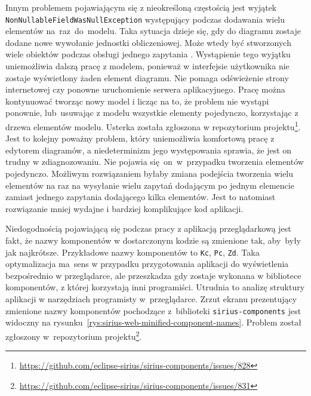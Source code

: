 Innym problemem pojawiającym się z nieokreśloną częstością jest wyjątek
\texttt{NonNullable\-FieldWasNullException} występujący podczas
dodawania wielu
elementów na~raz~do~modelu. Taka sytuacja dzieje się, gdy do diagramu zostaje
dodane nowe wywołanie jednostki obliczeniowej. Może wtedy być stworzonych wiele
obiektów podczas obsługi jednego zapytania \GraphQL{}. Wystąpienie tego
wyjątku uniemożliwia dalszą pracę z modelem, ponieważ w interfejsie użytkownika
nie zostaje wyświetlony żaden element diagramu. Nie pomaga odświeżenie strony
internetowej czy ponowne uruchomienie serwera aplikacyjnego. Pracę można
kontynuować tworząc nowy model i licząc na to, że problem nie wystąpi ponownie,
lub~usuwając z modelu wszystkie elementy pojedynczo, korzystając z drzewa
elementów modelu. Usterka została zgłoszona w repozytorium
projektu\footnote{
	\url{https://github.com/eclipse-sirius/sirius-components/issues/828}
}. Jest to kolejny poważny problem, który uniemożliwia komfortową pracę z
edytorem diagramów, a niedeterminizm jego występowania sprawia, że jest on
trudny w zdiagnozowaniu. Nie pojawia się~on~w~przypadku tworzenia elementów
pojedynczo. Możliwym rozwiązaniem byłaby zmiana podejścia tworzenia wielu
elementów na raz na wysyłanie wielu zapytań \GraphQL{} dodającym po jednym
elemencie zamiast jednego zapytania dodającego kilka elementów. Jest to
natomiast rozwiązanie mniej wydajne i bardziej komplikujące kod aplikacji.

Niedogodnością pojawiającą się podczas pracy z aplikacją przeglądarkową
\SiriusWeb{} jest fakt, że nazwy komponentów w dostarczonym kodzie
\JavaScript{} są zmienione tak, aby~były jak najkrótsze. Przykładowe nazwy
komponentów to \texttt{Kc}, \texttt{Pc}, \texttt{Zd}. Taka optymalizacja
ma~sens w przypadku przygotowania aplikacji do wyświetlenia bezpośrednio w
przeglądarce, ale przeszkadza gdy zostaje wykonana w bibliotece komponentów, z
której korzystają inni programiści. Utrudnia to analizę
struktury aplikacji w
narzędziach programisty w~przeglądarce. Zrzut ekranu prezentujący zmienione
nazwy komponentów pochodzące z~biblioteki \texttt{sirius-components} jest
widoczny na rysunku~\ref{rys:sirius-web-minified-component-names}. Problem
został zgłoszony w~repozytorium
projektu\footnote{
	\url{https://github.com/eclipse-sirius/sirius-components/issues/831}
}.

